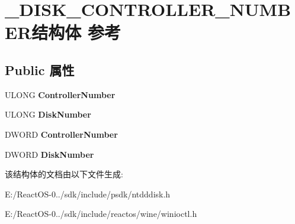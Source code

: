 \hypertarget{struct___d_i_s_k___c_o_n_t_r_o_l_l_e_r___n_u_m_b_e_r}{}\section{\+\_\+\+D\+I\+S\+K\+\_\+\+C\+O\+N\+T\+R\+O\+L\+L\+E\+R\+\_\+\+N\+U\+M\+B\+E\+R结构体 参考}
\label{struct___d_i_s_k___c_o_n_t_r_o_l_l_e_r___n_u_m_b_e_r}
\subsection*{Public 属性}
\begin{DoxyCompactItemize}
\item 
\mbox{\label{struct___d_i_s_k___c_o_n_t_r_o_l_l_e_r___n_u_m_b_e_r_a43d7d077235afba881408d74730b4ee2}} 
U\+L\+O\+NG {\bfseries Controller\+Number}
\item 
\mbox{\label{struct___d_i_s_k___c_o_n_t_r_o_l_l_e_r___n_u_m_b_e_r_aea2a62eac4be37ccc469d9207b0f3c63}} 
U\+L\+O\+NG {\bfseries Disk\+Number}
\item 
\mbox{\label{struct___d_i_s_k___c_o_n_t_r_o_l_l_e_r___n_u_m_b_e_r_a6b722cdec130876a9e159662f72fc33e}} 
D\+W\+O\+RD {\bfseries Controller\+Number}
\item 
\mbox{\label{struct___d_i_s_k___c_o_n_t_r_o_l_l_e_r___n_u_m_b_e_r_af4e395bd5eb11a9603180d452b50079b}} 
D\+W\+O\+RD {\bfseries Disk\+Number}
\end{DoxyCompactItemize}


该结构体的文档由以下文件生成\+:\begin{DoxyCompactItemize}
\item 
E\+:/\+React\+O\+S-\/0../sdk/include/psdk/ntdddisk.\+h\item 
E\+:/\+React\+O\+S-\/0../sdk/include/reactos/wine/winioctl.\+h\end{DoxyCompactItemize}

